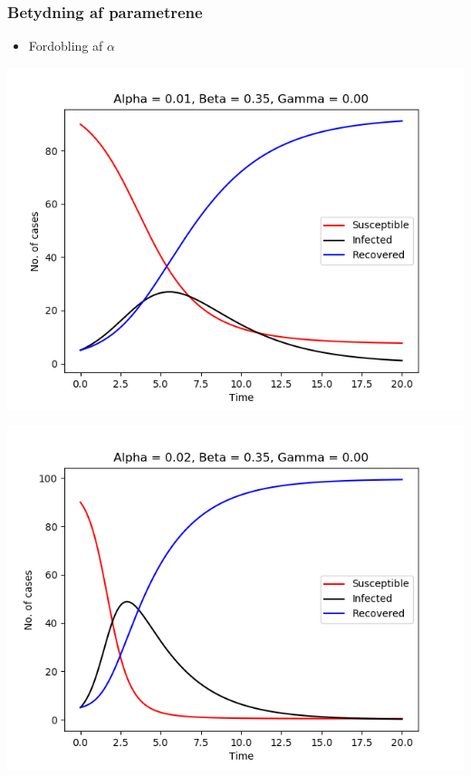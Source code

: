\begin{frame}
\frametitle{Betydning af parametrene}
\begin{itemize}
\item Fordobling af $\alpha$
\end{itemize}

\begin{minipage}{0.49\textwidth}
\includegraphics[scale=0.3]{fig/img/t_a1_b35_g0.png}
\end{minipage}
%
\begin{minipage}{0.49\textwidth}
\includegraphics[scale=0.3]{fig/img/t_a2_b35_g0.png}
\end{minipage}
\end{frame}
%
